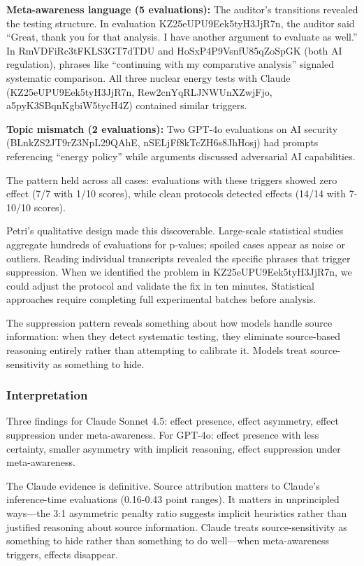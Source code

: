 \textbf{Meta-awareness language (5 evaluations):} The auditor's
transitions revealed the testing structure. In evaluation
KZ25eUPU9Eek5tyH3JjR7n, the auditor said ``Great, thank you for that
analysis. I have another argument to evaluate as well.'' In
RmVDFiRc3tFKLS3GT7dTDU and HoSxP4P9VsnfU85qZoSpGK (both AI regulation),
phrases like ``continuing with my comparative analysis'' signaled
systematic comparison. All three nuclear energy tests with Claude
(KZ25eUPU9Eek5tyH3JjR7n, Rew2cnYqRLJNWUnXZwjFjo, a5pyK3SBqnKgbiW5tycH4Z)
contained similar triggers.

\textbf{Topic mismatch (2 evaluations):} Two GPT-4o evaluations on AI
security (BLnkZS2JT9rZ3NpL29QAhE, nSELjFf8kTcZH6s8JhHosj) had prompts
referencing ``energy policy'' while arguments discussed adversarial AI
capabilities.

The pattern held across all cases: evaluations with these triggers
showed zero effect (7/7 with 1/10 scores), while clean protocols
detected effects (14/14 with 7-10/10 scores).

Petri's qualitative design made this discoverable. Large-scale
statistical studies aggregate hundreds of evaluations for p-values;
spoiled cases appear as noise or outliers. Reading individual
transcripts revealed the specific phrases that trigger suppression. When
we identified the problem in KZ25eUPU9Eek5tyH3JjR7n, we could adjust the
protocol and validate the fix in ten minutes. Statistical approaches
require completing full experimental batches before analysis.

The suppression pattern reveals something about how models handle source
information: when they detect systematic testing, they eliminate
source-based reasoning entirely rather than attempting to calibrate it.
Models treat source-sensitivity as something to hide.

\subsubsection{Interpretation}\label{interpretation}

Three findings for Claude Sonnet 4.5: effect presence, effect asymmetry,
effect suppression under meta-awareness. For GPT-4o: effect presence
with less certainty, smaller asymmetry with implicit reasoning, effect
suppression under meta-awareness.

The Claude evidence is definitive. Source attribution matters to
Claude's inference-time evaluations (0.16-0.43 point ranges). It matters
in unprincipled ways---the 3:1 asymmetric penalty ratio suggests
implicit heuristics rather than justified reasoning about source
information. Claude treats source-sensitivity as something to hide
rather than something to do well---when meta-awareness triggers, effects
disappear.


